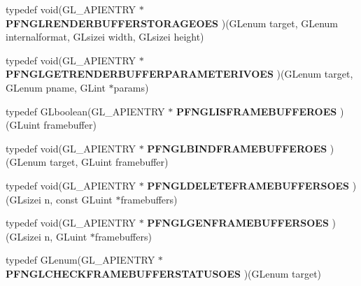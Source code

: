 \begin{DoxyCompactItemize}
\item 
\hypertarget{class_c_p_v_r_tgles_ext_ae081aa7ab181c6e0dffc90c7b6f45718}{typedef void(G\+L\+\_\+\+A\+P\+I\+E\+N\+T\+R\+Y $\ast$ {\bfseries P\+F\+N\+G\+L\+R\+E\+N\+D\+E\+R\+B\+U\+F\+F\+E\+R\+S\+T\+O\+R\+A\+G\+E\+O\+E\+S} )(G\+Lenum target, G\+Lenum internalformat, G\+Lsizei width, G\+Lsizei height)}\label{class_c_p_v_r_tgles_ext_ae081aa7ab181c6e0dffc90c7b6f45718}

\item 
\hypertarget{class_c_p_v_r_tgles_ext_a3d6b3126b2d91a505ab0d84fb5f54e27}{typedef void(G\+L\+\_\+\+A\+P\+I\+E\+N\+T\+R\+Y $\ast$ {\bfseries P\+F\+N\+G\+L\+G\+E\+T\+R\+E\+N\+D\+E\+R\+B\+U\+F\+F\+E\+R\+P\+A\+R\+A\+M\+E\+T\+E\+R\+I\+V\+O\+E\+S} )(G\+Lenum target, G\+Lenum pname, G\+Lint $\ast$params)}\label{class_c_p_v_r_tgles_ext_a3d6b3126b2d91a505ab0d84fb5f54e27}

\item 
\hypertarget{class_c_p_v_r_tgles_ext_a07fa828348b705e23231904e23f40904}{typedef G\+Lboolean(G\+L\+\_\+\+A\+P\+I\+E\+N\+T\+R\+Y $\ast$ {\bfseries P\+F\+N\+G\+L\+I\+S\+F\+R\+A\+M\+E\+B\+U\+F\+F\+E\+R\+O\+E\+S} )(G\+Luint framebuffer)}\label{class_c_p_v_r_tgles_ext_a07fa828348b705e23231904e23f40904}

\item 
\hypertarget{class_c_p_v_r_tgles_ext_ad439c78c33666eca0aa3945f7f67ef42}{typedef void(G\+L\+\_\+\+A\+P\+I\+E\+N\+T\+R\+Y $\ast$ {\bfseries P\+F\+N\+G\+L\+B\+I\+N\+D\+F\+R\+A\+M\+E\+B\+U\+F\+F\+E\+R\+O\+E\+S} )(G\+Lenum target, G\+Luint framebuffer)}\label{class_c_p_v_r_tgles_ext_ad439c78c33666eca0aa3945f7f67ef42}

\item 
\hypertarget{class_c_p_v_r_tgles_ext_a9a2fd789c5e5c5f78ebcca615518d74a}{typedef void(G\+L\+\_\+\+A\+P\+I\+E\+N\+T\+R\+Y $\ast$ {\bfseries P\+F\+N\+G\+L\+D\+E\+L\+E\+T\+E\+F\+R\+A\+M\+E\+B\+U\+F\+F\+E\+R\+S\+O\+E\+S} )(G\+Lsizei n, const G\+Luint $\ast$framebuffers)}\label{class_c_p_v_r_tgles_ext_a9a2fd789c5e5c5f78ebcca615518d74a}

\item 
\hypertarget{class_c_p_v_r_tgles_ext_aceab727cde7844d3b965649935905fe2}{typedef void(G\+L\+\_\+\+A\+P\+I\+E\+N\+T\+R\+Y $\ast$ {\bfseries P\+F\+N\+G\+L\+G\+E\+N\+F\+R\+A\+M\+E\+B\+U\+F\+F\+E\+R\+S\+O\+E\+S} )(G\+Lsizei n, G\+Luint $\ast$framebuffers)}\label{class_c_p_v_r_tgles_ext_aceab727cde7844d3b965649935905fe2}

\item 
\hypertarget{class_c_p_v_r_tgles_ext_a89cc1f142c76a043923f782073689ff2}{typedef G\+Lenum(G\+L\+\_\+\+A\+P\+I\+E\+N\+T\+R\+Y $\ast$ {\bfseries P\+F\+N\+G\+L\+C\+H\+E\+C\+K\+F\+R\+A\+M\+E\+B\+U\+F\+F\+E\+R\+S\+T\+A\+T\+U\+S\+O\+E\+S} )(G\+Lenum target)}\label{class_c_p_v_r_tgles_ext_a89cc1f142c76a043923f782073689ff2}


\end{DoxyCompactItemize}
